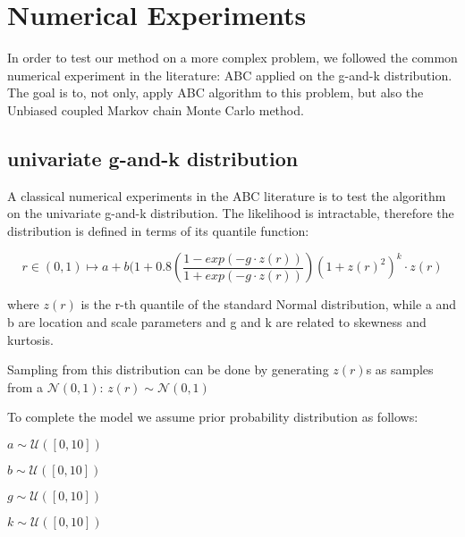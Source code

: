 \documentclass{article}
\begin{document}
	
	
	
	
	\section{Numerical Experiments}
	In order to test our method on a more complex problem, we followed the common numerical experiment in the literature: ABC applied on the g-and-k distribution.
	The goal is to, not only, apply ABC algorithm to this problem, but also the Unbiased coupled Markov chain Monte Carlo method.
	
	
	\subsection{univariate g-and-k distribution}
	
	A classical numerical experiments in the ABC literature is to test the algorithm on the univariate g-and-k distribution.
	The likelihood is intractable, therefore the distribution is defined in terms of its quantile function:
	
		\begin{center}
		
		$$ r \in (0,1) \longmapsto   a + b (1+0.8\left(\frac{1-exp(-g \cdot z(r))}{1+exp(-g\cdot z(r))}\right)(1+ z(r)^{2})^k\cdot z(r)  $$
		\end{center}
	

	
	where $z(r)$ is the r-th quantile of the standard Normal distribution,
	while a and b are location and scale parameters and g and k are related to skewness and kurtosis.
	

	Sampling from this distribution can be done by generating $z(r)$s as samples from a $\mathcal{N}(0,1)$: 
	$z(r) \sim \mathcal{N}(0,1)$
	
	To complete the model we assume prior probability distribution as follows:
	\begin{center}
	$ a \sim \mathcal{U}([0,10])$
	
	$ b \sim \mathcal{U}([0,10])$
	
	$ g \sim \mathcal{U}([0,10])$
	
	$ k \sim \mathcal{U}([0,10])$
	\end{center}
	
\end{document}
